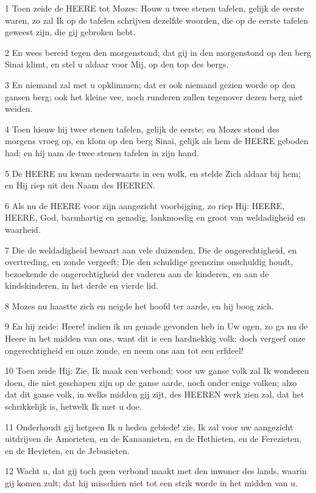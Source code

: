 \par 1 Toen zeide de HEERE tot Mozes: Houw u twee stenen tafelen, gelijk de eerste waren, zo zal Ik op de tafelen schrijven dezelfde woorden, die op de eerste tafelen geweest zijn, die gij gebroken hebt.
\par 2 En wees bereid tegen den morgenstond; dat gij in den morgenstond op den berg Sinai klimt, en stel u aldaar voor Mij, op den top des bergs.
\par 3 En niemand zal met u opklimmen; dat er ook niemand gezien worde op den gansen berg; ook het kleine vee, noch runderen zullen tegenover dezen berg niet weiden.
\par 4 Toen hieuw hij twee stenen tafelen, gelijk de eerste; en Mozes stond des morgens vroeg op, en klom op den berg Sinai, gelijk als hem de HEERE geboden had; en hij nam de twee stenen tafelen in zijn hand.
\par 5 De HEERE nu kwam nederwaarts in een wolk, en stelde Zich aldaar bij hem; en Hij riep uit den Naam des HEEREN.
\par 6 Als nu de HEERE voor zijn aangezicht voorbijging, zo riep Hij: HEERE, HEERE, God, barmhartig en genadig, lankmoedig en groot van weldadigheid en waarheid.
\par 7 Die de weldadigheid bewaart aan vele duizenden, Die de ongerechtigheid, en overtreding, en zonde vergeeft; Die den schuldige geenszins onschuldig houdt, bezoekende de ongerechtigheid der vaderen aan de kinderen, en aan de kindskinderen, in het derde en vierde lid.
\par 8 Mozes nu haastte zich en neigde het hoofd ter aarde, en hij boog zich.
\par 9 En hij zeide: Heere! indien ik nu genade gevonden heb in Uw ogen, zo ga nu de Heere in het midden van ons, want dit is een hardnekkig volk; doch vergeef onze ongerechtigheid en onze zonde, en neem ons aan tot een erfdeel!
\par 10 Toen zeide Hij: Zie, Ik maak een verbond; voor uw ganse volk zal Ik wonderen doen, die niet geschapen zijn op de ganse aarde, noch onder enige volken; alzo dat dit ganse volk, in welks midden gij zijt, des HEEREN werk zien zal, dat het schrikkelijk is, hetwelk Ik met u doe.
\par 11 Onderhoudt gij hetgeen Ik u heden gebiede! zie, Ik zal voor uw aangezicht uitdrijven de Amorieten, en de Kanaanieten, en de Hethieten, en de Ferezieten, en de Hevieten, en de Jebusieten.
\par 12 Wacht u, dat gij toch geen verbond maakt met den inwoner des lands, waarin gij komen zult; dat hij misschien niet tot een strik worde in het midden van u.
